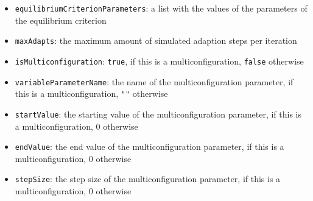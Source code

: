 \documentclass[parskip=full,11pt]{scrartcl}
\begin{document}
\begin{itemize}
\item[] \texttt{equilibriumCriterionParameters}: a list with the values of the parameters of the equilibrium criterion
\item[] \texttt{maxAdapts}: the maximum amount of simulated adaption steps per iteration
\item[] \texttt{isMulticonfiguration}: \texttt{true}, if this is a multiconfiguration, \texttt{false} otherwise
\item[] \texttt{variableParameterName}: the name of the multiconfiguration parameter, if this is a multiconfiguration, \texttt{""} otherwise
\item[] \texttt{startValue}: the starting value of the multiconfiguration parameter, if this is a multiconfiguration, \(0\) otherwise
\item[] \texttt{endValue}: the end value of the multiconfiguration parameter, if this is a multiconfiguration, \(0\) otherwise
\item[] \texttt{stepSize}: the step size of the multiconfiguration parameter, if this is a multiconfiguration, \(0\) otherwise
\end{itemize}
\end{document}
